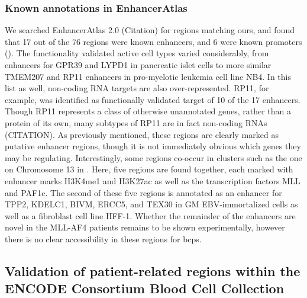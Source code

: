 
\subsubsection{Known annotations in EnhancerAtlas} 

We searched EnhancerAtlas 2.0 (Citation) for regions matching ours, and found that 17 out of the 76 regions were known enhancers, and 6 were known promoters (). The functionality validated active cell types varied considerably, from enhancers for GPR39 and LYPD1 in pancreatic islet cells to more similar TMEM207 and RP11 enhancers in pro-myelotic leukemia cell line NB4. In this list as well, non-coding RNA targets are also over-represented. RP11, for example, was identified as functionally validated target of 10 of the 17 enhancers. Though RP11 represents a class of otherwise unannotated genes, rather than a protein of its own, many subtypes of RP11 are in fact non-coding RNAs (CITATION). As previously mentioned, these regions are clearly marked as putative enhancer regions, though it is not immediately obvious which genes they may be regulating. Interestingly, some regions co-occur in clusters such as the one on Chromosome 13 in . Here, five regions are found together, each marked with enhancer marks H3K4me1 and H3K27ac as well as the transcription factors MLL and PAF1c. The second of these five regions is annotated as an enhancer for TPP2, KDELC1, BIVM, ERCC5, and TEX30 in GM EBV-immortalized cells as well as a fibroblast cell line HFF-1. Whether the remainder of the enhancers are novel in the MLL-AF4 patients remains to be shown experimentally, however there is no clear accessibility in these regions for \glspl{bcp}. 


\subsection{Validation of patient-related regions within the ENCODE Consortium Blood Cell Collection}

